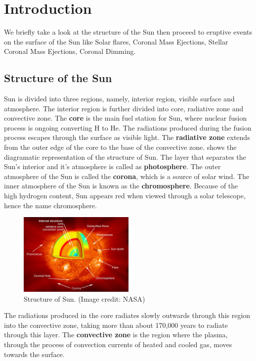 \section{Introduction}

We briefly take a look at the structure of the Sun then proceed to eruptive events on the surface of the Sun like Solar flares, Coronal Mass Ejections, Stellar Coronal Mass Ejections, Coronal Dimming.

\subsection{Structure of the Sun}

Sun is divided into three regions, namely, interior region, visible surface and atmosphere. The interior region is further divided into core, radiative zone and convective zone. The \textbf{core} is the main fuel station for Sun, where nuclear fusion process is ongoing converting H to He. The radiations produced during the fusion process escapes through the surface as visible light. The \textbf{radiative zone} extends from the outer edge of the core to the base of the convective zone.  shows the diagramatic representation of the structure of Sun. The layer that separates the Sun's interior and it's atmosphere is called as \textbf{photosphere}. The outer atmosphere of the Sun is called the \textbf{corona}, which is a source of solar wind. The inner atmosphere of the Sun is known as the \textbf{chromosphere}. Because of the high hydrogen content, Sun appears red when viewed through a solar telescope, hence the name chromosphere.

\begin{figure}[h!]
    \centering
    \includegraphics[width=0.5\textwidth]{images/structure_of_sun.jpg}
    \caption[Structure of the Sun]{Structure of Sun. (Image credit: NASA)}
    \label{fig:structure_of_sun}
\end{figure}

The radiations produced in the core radiates slowly outwards through this region into the convective zone, taking more than about 170,000 years to radiate through this layer. The \textbf{convective zone} is the region where the plasma, through the process of convection currents of heated and cooled gas, moves towards the surface.

